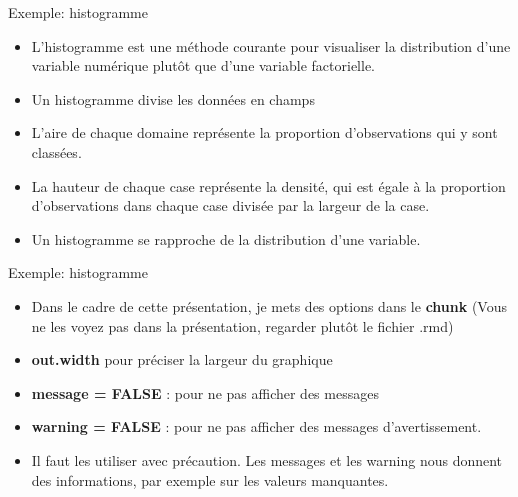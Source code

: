 \documentclass[
  ignorenonframetext,
]{beamer}
\providecommand{\tightlist}{%
  \setlength{\itemsep}{0pt}\setlength{\parskip}{0pt}}
\begin{document}
\begin{frame}{Exemple: histogramme}
\protect\hypertarget{exemple-histogramme-1}{}
\begin{itemize}
\tightlist
\item
  L'histogramme est une méthode courante pour visualiser la distribution
  d'une variable numérique plutôt que d'une variable factorielle.
\item
  Un histogramme divise les données en champs
\item
  L'aire de chaque domaine représente la proportion d'observations qui y
  sont classées.
\item
  La hauteur de chaque case représente la densité, qui est égale à la
  proportion d'observations dans chaque case divisée par la largeur de
  la case.
\item
  Un histogramme se rapproche de la distribution d'une variable.
\end{itemize}
\end{frame}

\begin{frame}{Exemple: histogramme}
\protect\hypertarget{exemple-histogramme-2}{}
\begin{itemize}
\item
  Dans le cadre de cette présentation, je mets des options dans le
  \textbf{chunk} (Vous ne les voyez pas dans la présentation, regarder
  plutôt le fichier .rmd)
\item
  \textbf{out.width} pour préciser la largeur du graphique
\item
  \textbf{message = FALSE} : pour ne pas afficher des messages
\item
  \textbf{warning = FALSE} : pour ne pas afficher des messages
  d'avertissement.
\item
  Il faut les utiliser avec précaution. Les messages et les warning nous
  donnent des informations, par exemple sur les valeurs manquantes.
\end{itemize}
\end{frame}
\end{document}
